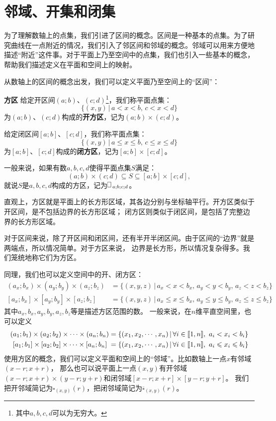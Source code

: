 \documentclass[12pt,UTF8,fontset=none]{ctexbook}
\begin{document}
\section{邻域、开集和闭集}

为了理解数轴上的点集，我们引进了区间的概念。区间是一种基本的点集。为了研究曲线在一点附近的情况，我们引入了邻区间和邻域的概念。邻域可以用来方便地描述“附近”这件事。对于平面上乃至空间中的点集，我们也引入一些基本的概念，帮助我们描述定义在平面和空间上的映射。

从数轴上的区间的概念出发，我们可以定义平面乃至空间上的“区间”：

\begin{df}{\textbf{方区}}
    给定开区间$(a;b)$、$(c;d)$\footnote{其中$a,b,c,d$可以为无穷大。}，我们称平面点集：
    $$\{(x, y) \, | \, a < x < b,\, c< x < d\}$$
    为$(a;b)$、$(c;d)$构成的\textbf{开方区}，记为$(a;b)\times(c;d)$。

    给定闭区间$[a;b]$、$[c;d]$，我们称平面点集：
    $$\{(x, y) \, | \, a \leqslant x \leqslant b,\, c \leqslant x \leqslant d\}$$
    为$[a;b]$、$[c;d]$构成的\textbf{闭方区}，记为$[a;b]\times[c;d]$。

    一般来说，如果有数$a,b,c,d$使得平面点集$S$满足：
    $$(a;b)\times(c;d) \subseteq S \subseteq [a;b]\times[c;d],$$
    就说$S$是$a,b,c,d$构成的方区，记为$\rectbx_{a;b;c;d}$。

\end{df}

直观上，方区就是平面上的长方形区域，其各边分别与坐标轴平行。开方区类似于开区间，是不包括边界的长方形区域；
闭方区则类似于闭区间，是包括了完整边界的长方形区域。

对于区间来说，除了开区间和闭区间，还有半开半闭区间。由于区间的“边界”就是两端点，所以情况简单。对于方区来说，
边界是长方形，所以情况复杂得多。我们笼统地称它们为方区。

同理，我们也可以定义空间中的开、闭方区：
\begin{align*}
    (a_x;b_x)\times(a_y;b_y)\times(a_z;b_z) &= \{(x, y, z) \, | \, a_x < x < b_x,\, a_y < y < b_y,\, a_z < z < b_z\} \\
    [a_x;b_x]\times[a_y;b_y]\times[a_z;b_z]\; &= \{(x, y, z) \, | \, a_x \leqslant  x \leqslant b_x,\, a_y \leqslant y \leqslant b_y,\, a_z \leqslant z \leqslant b_z\}
\end{align*}
其中$a_x, b_x, a_y, b_y, a_z, b_z$等是描述方区范围的数。
一般来说，在$n$维平直空间里，也可以定义
\begin{align*}
    (a_1;b_1)\times(a_2;b_2)\times\cdots\times(a_n;b_n) &= \{(x_1, x_2, \cdots, x_n) \, | \, \forall i\in[\![1,n]\!],\,\, a_i < x_i < b_i\} \\
    [a_1;b_1]\times[a_2;b_2]\times\cdots\times[a_n;b_n]\; &= \{(x_1, x_2, \cdots, x_n) \, | \, \forall i\in[\![1,n]\!],\,\, a_i \leqslant x_i \leqslant b_i\} 
\end{align*}
使用方区的概念，我们可以定义平面和空间上的“邻域”。比如数轴上一点$x$有邻域$(x-r;x+r)$，
那么也可以说平面上一点$(x, y)$有开邻域$(x-r;x+r)\times(y-r;y+r)$和闭邻域$[x-r;x+r]\times[y-r;y+r]$。
我们把开邻域简记为$\square_{(x,y)}(r)$，把闭邻域简记为$\overline{\square}_{(x,y)}(r)$。
\end{document}
